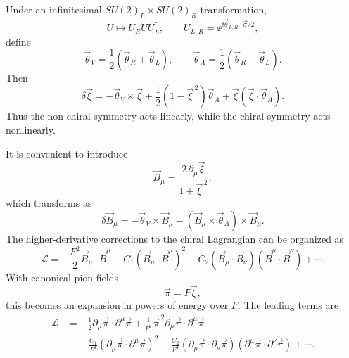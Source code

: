 Under an infinitesimal \(SU(2)_L\times SU(2)_R\) transformation,
\[
  U\longmapsto U_RUU_L^\dagger,
  \qquad
  U_{L,R}=\ee^{\ii\vec\theta_{L,R}\cdot\vec\sigma/2},
\]
define
\[
  \vec\theta_V=\frac12(\vec\theta_R+\vec\theta_L),
  \qquad
  \vec\theta_A=\frac12(\vec\theta_R-\vec\theta_L).
\]
Then
\[
  \delta\vec\xi
  =
  -\vec\theta_V\times\vec\xi
  +\frac12(1-\vec\xi^{\,2})\vec\theta_A
  +\vec\xi(\vec\xi\cdot\vec\theta_A).
\]
Thus the non-chiral symmetry acts linearly, while the chiral symmetry
acts nonlinearly.

It is convenient to introduce
\[
  \vec B_\mu
  =
  \frac{2\,\partial_\mu\vec\xi}{1+\vec\xi^{\,2}},
\]
which transforms as
\[
  \delta\vec B_\mu
  =
  -\vec\theta_V\times\vec B_\mu
  -(\vec B_\mu\times\vec\theta_A)\times\vec B_\mu .
\]
The higher-derivative corrections to the chiral Lagrangian can be
organized as
\[
  \mathcal L
  =
  -\frac{F^2}{2}\vec B_\mu\cdot\vec B^\mu
  -C_1(\vec B_\mu\cdot\vec B^\mu)^2
  -C_2(\vec B_\mu\cdot\vec B_\nu)
      (\vec B^\mu\cdot\vec B^\nu)
  +\cdots .
\]
With canonical pion fields
\[
  \vec\pi=F\vec\xi,
\]
this becomes an expansion in powers of energy over \(F\).  The leading
terms are
\[
\begin{aligned}
  \mathcal L
  &=
  -\frac12\partial_\mu\vec\pi\cdot\partial^\mu\vec\pi
  +\frac1{F^2}\vec\pi^{\,2}
   \partial_\mu\vec\pi\cdot\partial^\mu\vec\pi
\\
  &\quad
  -\frac{C_1}{F^4}
  (\partial_\mu\vec\pi\cdot\partial^\mu\vec\pi)^2
  -\frac{C_2}{F^4}
  (\partial_\mu\vec\pi\cdot\partial_\nu\vec\pi)
  (\partial^\mu\vec\pi\cdot\partial^\nu\vec\pi)
  +\cdots .
\end{aligned}
\]

